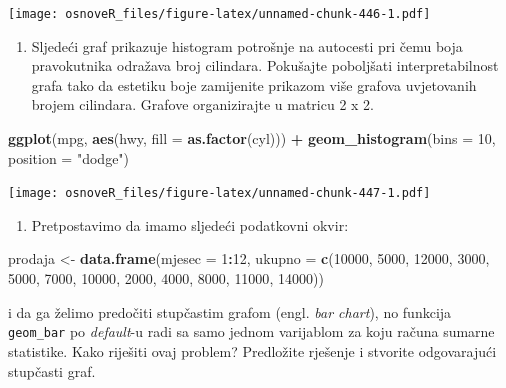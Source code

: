 \documentclass[]{book}
\newenvironment{Shaded}{\begin{snugshade}}{\end{snugshade}}
\newcommand{\KeywordTok}[1]{\textcolor[rgb]{0.13,0.29,0.53}{\textbf{#1}}}
\newcommand{\DataTypeTok}[1]{\textcolor[rgb]{0.13,0.29,0.53}{#1}}
\newcommand{\DecValTok}[1]{\textcolor[rgb]{0.00,0.00,0.81}{#1}}
\newcommand{\StringTok}[1]{\textcolor[rgb]{0.31,0.60,0.02}{#1}}
\newcommand{\OperatorTok}[1]{\textcolor[rgb]{0.81,0.36,0.00}{\textbf{#1}}}
\newcommand{\NormalTok}[1]{#1}
\providecommand{\tightlist}{%
  \setlength{\itemsep}{0pt}\setlength{\parskip}{0pt}}
\theoremstyle{definition}
\theoremstyle{definition}
\theoremstyle{definition}
\theoremstyle{remark}
\begin{document}
\texttt{[image: osnoveR\_files/figure-latex/unnamed-chunk-446-1.pdf]}

\begin{enumerate}
\def\labelenumi{\arabic{enumi}.}
\setcounter{enumi}{4}
\tightlist
\item
  Sljedeći graf prikazuje histogram potrošnje na autocesti pri čemu boja
  pravokutnika odražava broj cilindara. Pokušajte poboljšati
  interpretabilnost grafa tako da estetiku boje zamijenite prikazom više
  grafova uvjetovanih brojem cilindara. Grafove organizirajte u matricu
  2 x 2.
\end{enumerate}

\begin{Shaded}
\begin{Highlighting}[]
\KeywordTok{ggplot}\NormalTok{(mpg, }\KeywordTok{aes}\NormalTok{(hwy, }\DataTypeTok{fill =} \KeywordTok{as.factor}\NormalTok{(cyl))) }\OperatorTok{+}\StringTok{ }
\StringTok{  }\KeywordTok{geom_histogram}\NormalTok{(}\DataTypeTok{bins =} \DecValTok{10}\NormalTok{, }\DataTypeTok{position =} \StringTok{"dodge"}\NormalTok{)}
\end{Highlighting}
\end{Shaded}

\texttt{[image: osnoveR\_files/figure-latex/unnamed-chunk-447-1.pdf]}

\begin{enumerate}
\def\labelenumi{\arabic{enumi}.}
\setcounter{enumi}{5}
\tightlist
\item
  Pretpostavimo da imamo sljedeći podatkovni okvir:
\end{enumerate}

\begin{Shaded}
\begin{Highlighting}[]
\NormalTok{prodaja <-}\StringTok{ }\KeywordTok{data.frame}\NormalTok{(}\DataTypeTok{mjesec =} \DecValTok{1}\OperatorTok{:}\DecValTok{12}\NormalTok{,}
          \DataTypeTok{ukupno =} \KeywordTok{c}\NormalTok{(}\DecValTok{10000}\NormalTok{, }\DecValTok{5000}\NormalTok{, }\DecValTok{12000}\NormalTok{, }\DecValTok{3000}\NormalTok{, }\DecValTok{5000}\NormalTok{, }\DecValTok{7000}\NormalTok{, }
                   \DecValTok{10000}\NormalTok{, }\DecValTok{2000}\NormalTok{, }\DecValTok{4000}\NormalTok{, }\DecValTok{8000}\NormalTok{, }\DecValTok{11000}\NormalTok{, }\DecValTok{14000}\NormalTok{))}
\end{Highlighting}
\end{Shaded}

i da ga želimo predočiti stupčastim grafom (engl. \emph{bar chart}), no
funkcija \texttt{geom\_bar} po \emph{default}-u radi sa samo jednom
varijablom za koju računa sumarne statistike. Kako riješiti ovaj
problem? Predložite rješenje i stvorite odgovarajući stupčasti graf.
\end{document}
